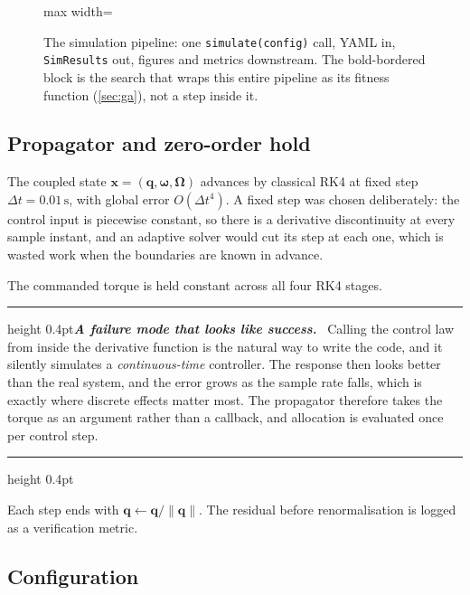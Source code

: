 \documentclass[conference,10pt,a4paper]{IEEEtran}
\newcommand{\remarkrule}{\par\nobreak\vspace{2pt}%
  \hrule height 0.4pt\vspace{4pt}\nobreak}
\newenvironment{cautionbox}[1][Caveat]
  {\par\medskip\remarkrule\noindent\small\textbf{\textit{#1.}}\ \ignorespaces}
  {\par\vspace{3pt}\hrule height 0.4pt\par\medskip\ignorespacesafterend}
\newcommand{\vect}[1]{\bm{#1}}
\newcommand{\unit}[1]{\ensuremath{\,\mathrm{#1}}}
\begin{document}
\begin{figure}[!t]
\begin{adjustbox}{max width=\textwidth}
\end{adjustbox}
\caption{The simulation pipeline: one \texttt{simulate(config)} call, YAML in,
\texttt{SimResults} out, figures and metrics downstream. The bold-bordered
block is the search that wraps this entire pipeline as its fitness function
(\cref{sec:ga}), not a step inside it.}
\label{fig:pipeline}
\end{figure}

\subsection{Propagator and zero-order hold}
\label{sec:zoh}

The coupled state $\vect{x}=(\vect{q},\vect{\omega},\vect{\Omega})$ advances by
classical RK4 at fixed step $\Delta t=0.01\unit{s}$, with global error
$O(\Delta t^4)$. A fixed step was chosen deliberately: the control input is
piecewise constant, so there is a derivative discontinuity at every sample
instant, and an adaptive solver would cut its step at each one, which is wasted
work when the boundaries are known in advance.

The commanded torque is held constant across all four RK4 stages.

\begin{cautionbox}[A failure mode that looks like success]
Calling the control law from inside the derivative function is the natural way
to write the code, and it silently simulates a \emph{continuous-time}
controller. The response then looks better than the real system, and the error
grows as the sample rate falls, which is exactly where discrete effects matter
most. The propagator therefore takes the torque as an argument rather than a
callback, and allocation is evaluated once per control step.
\end{cautionbox}

Each step ends with $\vect{q}\leftarrow\vect{q}/\|\vect{q}\|$. The residual
before renormalisation is logged as a verification metric.

\subsection{Configuration}
\label{sec:config}
\end{document}
